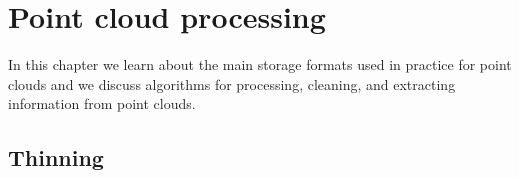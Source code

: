 
\setchapterpreamble[u]{\margintoc}


\graphicspath{{pcprocessing/figs/}}

\chapter{Point cloud processing}%
\label{chap:pcprocessing}

In this chapter we learn about  the main storage formats used in practice for point clouds and we discuss algorithms for processing, cleaning, and extracting information from point clouds.



%
\section{Thinning}%
\label{sec:thinning}%

